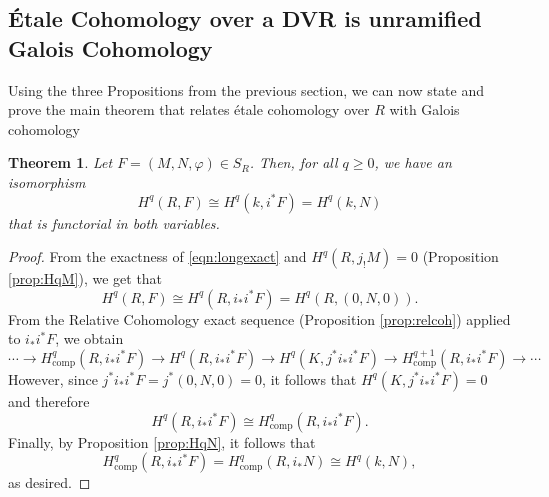 \documentclass{article}
\newcommand{\comp}{\mathrm{comp}}
\theoremstyle{plain}
\newtheorem{theorem}{Theorem}[section]
\theoremstyle{definition}
\begin{document}
    \subsection{\'{E}tale Cohomology over a DVR is unramified Galois Cohomology}
    Using the three Propositions from the previous section, we can now state and prove the main theorem that relates \'{e}tale cohomology over $R$ with Galois cohomology
    \begin{theorem}
        Let $F=(M,N,\varphi)\in S_R$. Then, for all $q\geq0$, we have an isomorphism
        $$H^q(R,F)\cong H^q(k,i^*F)=H^q(k,N)$$
        that is functorial in both variables.
    \end{theorem}
    \begin{proof}
        From the exactness of \eqref{eqn:longexact} and $H^q(R,j_!M)=0$ (Proposition \ref{prop:HqM}), we get that 
        $$H^q(R,F)\cong H^q(R,i_*i^*F)=H^q(R,(0,N,0)).$$
        From the Relative Cohomology exact sequence (Proposition \ref{prop:relcoh}) applied to $i_*i^*F$, we obtain 
        \begin{equation}
            \cdots\longrightarrow H^q_{\comp}(R,i_*i^*F)\longrightarrow H^q(R,i_*i^*F)\longrightarrow H^q(K,j^*i_*i^*F)\longrightarrow H^{q+1}_{\comp}(R,i_*i^*F)\longrightarrow\cdots 
        \end{equation}
        However, since $j^*i_*i^*F=j^*(0,N,0)=0$, it follows that $H^q(K,j^*i_*i^*F)=0$ and therefore
        $$H^q(R,i_*i^*F)\cong H^q_{\comp}(R,i_*i^*F).$$
        Finally, by Proposition \ref{prop:HqN}, it follows that 
        $$H^q_{\comp}(R,i_*i^*F)=H^q_{\comp}(R,i_*N)\cong H^q(k,N),$$
        as desired.
    \end{proof}
    
\end{document}

